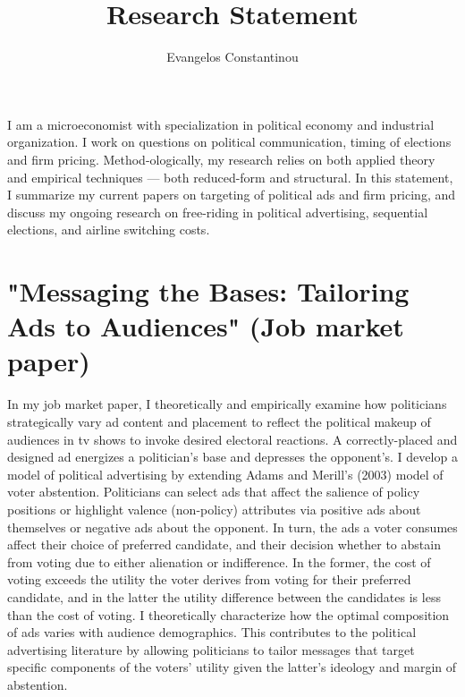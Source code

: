 \documentclass[12pt]{article}
\author{Evangelos Constantinou}
\date{}
\title{\bf{Research Statement}}
\begin{document}
\maketitle
I am a microeconomist with specialization in political economy and industrial organization.
I work on questions on political communication, timing of elections and firm pricing.
Method-ologically, my research relies on both applied theory and empirical techniques --- both reduced-form and structural.
In this statement, I summarize my current papers on targeting of political ads and firm pricing, and discuss my ongoing research on free-riding in political advertising, sequential elections, and airline switching costs.

\vspace{0.25cm}

\section{"Messaging the Bases: Tailoring Ads to Audiences" (Job market paper)}
\label{sec:orgf4bb63f}
\vspace{0.1cm}

\noindent
In my job market paper, I theoretically and empirically examine how politicians strategically vary ad content and placement to reflect the political makeup of audiences in tv shows to invoke desired electoral reactions.
A correctly-placed and designed ad energizes a politician's base and depresses the opponent's.
I develop a model of political advertising by extending Adams and Merill's (2003) model of voter abstention.
Politicians can select ads that affect the salience of policy positions or highlight valence (non-policy) attributes via positive ads about themselves or negative ads about the opponent.
In turn, the ads a voter consumes affect their choice of preferred candidate, and their decision whether to abstain from voting due to either alienation or indifference.
In the former, the cost of voting exceeds the utility the voter derives from voting for their preferred candidate, and in the latter the utility difference between the candidates is less than the cost of voting.
I theoretically characterize  how the optimal composition of ads varies with audience demographics.
This contributes to the political advertising literature by allowing politicians to tailor messages that target specific components of the voters' utility given the latter's ideology and margin of abstention.
\end{document}
